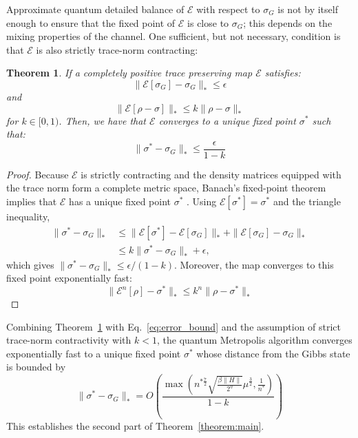 \documentclass[aps,floatfix,10pt,amssymb,amsfont,amsmath,superscriptaddress,float,nofootinbib,longbibliography,nobalancelastpage,twocolumn]{revtex4-2}
\newtheorem{theorem}{Theorem}
\begin{document}
 Approximate quantum detailed balance of $\mathcal{E}$ with respect to $\sigma_G$ is not by itself enough to ensure that the fixed point of $\mathcal{E}$ is close to $\sigma_G$; this depends on the mixing properties of the channel. One sufficient, but not necessary, condition is that $\mathcal{E}$ is also strictly trace-norm contracting:
 \begin{theorem}
     If a completely positive trace preserving map $\mathcal{E}$ satisfies:
     \begin{equation}
         \|\mathcal{E}[\sigma_G] - \sigma_G\|_* \leq \epsilon
     \end{equation}
     and
 \begin{equation}
     \|\mathcal{E}[\rho-\sigma]\|_* \leq k\|\rho-\sigma\|_*
 \end{equation}
 for $k \in [0,1)$. Then, we have that $\mathcal{E}$ converges to a unique fixed point $\sigma^*$ such that:
 \begin{equation}
     \| \sigma^* -\sigma_G\|_* \leq \frac{\epsilon}{1-k}
 \end{equation}
 \label{theorem:error_bound}
 \end{theorem}
 \begin{proof}
Because $\mathcal{E}$ is strictly contracting and the density matrices equipped with the trace norm form a complete metric space, Banach's fixed-point theorem implies that $\mathcal{E}$ has a unique fixed point $\sigma^*$ \cite{Mart_nez_Pe_a_2023,Raginsky_2002}. Using $\mathcal{E}[\sigma^*]=\sigma^*$ and the triangle inequality,
\begin{align}
 \|\sigma^*-\sigma_G\|_*
 &\leq \|\mathcal{E}[\sigma^*]-\mathcal{E}[\sigma_G]\|_*+\|\mathcal{E}[\sigma_G]-\sigma_G\|_*\\
 &\leq k\|\sigma^*-\sigma_G\|_*+\epsilon,
\end{align}
which gives $\|\sigma^*-\sigma_G\|_*\leq\epsilon/(1-k)$. Moreover, the map converges to this fixed point exponentially fast:
\begin{equation}
     \|\mathcal{E}^n[\rho] -\sigma^*\|_* \leq k^n\| \rho - \sigma^*\|_*
\end{equation}
 \end{proof}

Combining Theorem~\ref{theorem:error_bound} with Eq.~\eqref{eq:error_bound} and the assumption of strict trace-norm contractivity with $k<1$, the quantum Metropolis algorithm converges exponentially fast to a unique fixed point $\sigma^*$ whose distance from the Gibbs state is bounded by
\begin{equation}
    \|\sigma^*-\sigma_G\|_* = 
    O\left(\frac{\max\left( n^{*\frac{7}{2}}\sqrt{\frac{\beta\|H\| }{2^{\eta}}}\mu^{\frac{3}{2}},\frac{1}{n^*}\right)}{1-k}\right)
\end{equation}
This establishes the second part of Theorem~\ref{theorem:main}.
\end{document}
